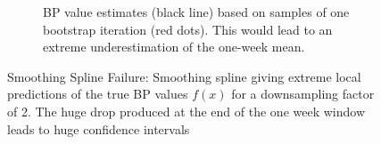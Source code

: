 \begin{figure}[!htb]
\begin{subfigure}{.42\textwidth}
  \caption[Estimate Single Bootstrap Sample]{
      BP value estimates (black line) based on samples of one bootstrap iteration (red dots). This would
  lead to an extreme underestimation of the one-week mean.}
    \label{subfig: ex-spline-failure-bootstrap}
\end{subfigure}
\caption[Smoothing Spline Failure]{
    Smoothing Spline Failure:
    Smoothing spline giving extreme local predictions of the true BP values $f(x)$
    for a downsampling factor of 2.
    The huge drop produced at the end of the one week window
    leads to huge confidence intervals}
\label{fig:ex-spline-failure}
\end{figure}






%
%
%
%
%












